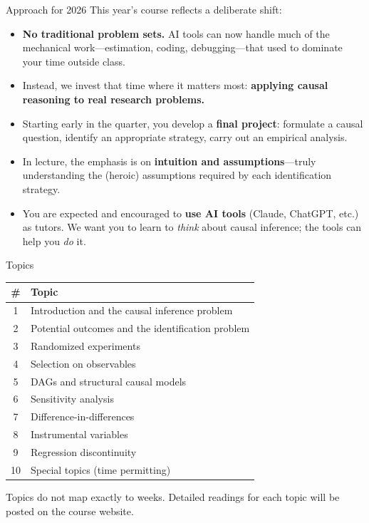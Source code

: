 \documentclass[handout,xcolor=dvipsnames,pdftex,hyperref={colorlinks=false}]{beamer}
\begin{document}

\begin{frame}{Approach for 2026}
 This year's course reflects a deliberate shift: \\
\medskip
\small
\begin{itemize}
\item<2-> \textbf{No traditional problem sets.} AI tools can now handle much of the mechanical work---estimation, coding, debugging---that used to dominate your time outside class.
\medskip
\item<3-> Instead, we invest that time where it matters most: \textbf{applying causal reasoning to real research problems.}
\medskip
\item<4-> Starting early in the quarter, you develop a \textbf{final project}: formulate a causal question, identify an appropriate strategy, carry out an empirical analysis.
\medskip
\item<5-> In lecture, the emphasis is on \textbf{intuition and assumptions}---truly understanding the (heroic) assumptions required by each identification strategy.
\medskip
\item<6-> You are expected and encouraged to \textbf{use AI tools} (Claude, ChatGPT, etc.) as tutors. We want you to learn to \textit{think} about causal inference; the tools can help you \textit{do} it.
\end{itemize}
\end{frame}


\begin{frame}{Topics}
\begin{table}[ht]
\renewcommand{\arraystretch}{1.3}
\centering
\small
\begin{tabular}{c l}
\hline
\textbf{\#} & \textbf{Topic} \\
\hline
1 & Introduction and the causal inference problem \\
2 & Potential outcomes and the identification problem \\
3 & Randomized experiments \\
4 & Selection on observables \\
5 & DAGs and structural causal models \\
6 & Sensitivity analysis \\
7 & Difference-in-differences \\
8 & Instrumental variables \\
9 & Regression discontinuity \\
10 & Special topics (time permitting) \\
\hline
\end{tabular}
\end{table}
\medskip
\small
Topics do not map exactly to weeks. Detailed readings for each topic will be posted on the course website.
\end{frame}
\end{document}

